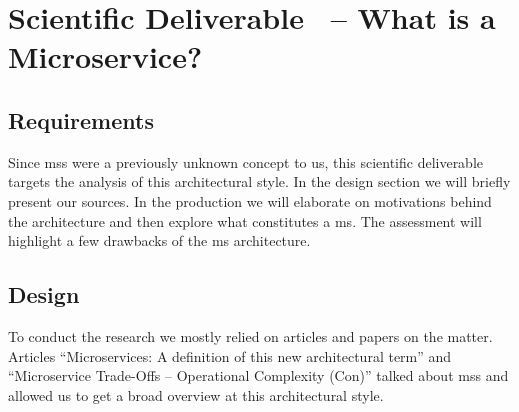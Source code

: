 \section{Scientific Deliverable \thesdel\ -- What is a Microservice?}
\label{sd:ms}


\subsection{Requirements}%

Since \glspl{ms} were a previously unknown concept to us, this
scientific deliverable targets the analysis of this architectural
style. In the design section we will briefly present our sources.  In
the production we will elaborate on motivations behind the
architecture and then explore what constitutes a \gls{ms}. The
assessment will highlight a few drawbacks of the \gls{ms}
architecture.

\subsection{Design}%

To conduct the research we mostly relied on articles and papers on the
matter. Articles \enquote{Microservices: A definition of this new architectural
term} \cite{ms-definition} and \enquote{Microservice Trade-Offs --
Operational Complexity (Con)} \cite{ms-trade-off} talked about
\glspl{ms} and allowed us to get a broad overview at this
architectural style.

